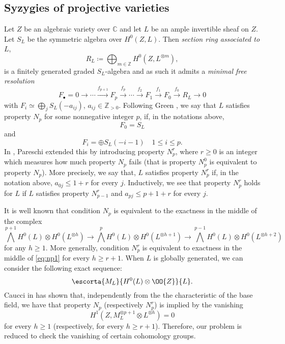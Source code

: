 \documentclass[11pt,letter]{amsart}
\numberwithin{equation}{section}
\begin{document}
\subsection{Syzygies of projective varieties}\label{sub:N_P}
Let $Z$ be an algebraic variety over $\mathbb{C}$ and let $L$ be an ample
invertible sheaf on $Z$. Let $S_L$ be the symmetric algebra over $H^0(Z,L)$. Then \textit{section ring associated to  $L$},
\[R_L\coloneqq \bigoplus_{m\in\mathbb{Z}}H^{0}({Z},{L^{
\otimes m}}),\]
is a finitely generated graded $S_L$-algebra and as such it admits a \textit{minimal free
resolution} 
\begin{equation}\label{minalfree}
F_\bullet = 0\rightarrow\cdots\xrightarrow{f_{p+1}}
F_p\xrightarrow{f_p}\cdots\xrightarrow{f_2} F_1\xrightarrow{f_1}
F_0\xrightarrow{f_0}R_L\rightarrow 0
\end{equation}
with  $F_i\simeq\bigoplus_j S_L(-a_{ij})$, $a_{ij}\in\mathbb  Z_{>0}$.
Following Green \cite{green1984koszul},  we say that $L$ satisfies
property $N_p$ for some nonnegative integer $p$, if, in the notations above,
$$F_0=S_L$$
and
$$F_i=\oplus S_L(-i-1)\quad 1\leq i\leq p.$$
In \cite{pareschi2000syzygies}, Pareschi  extended this by introducing property $N_p^r$, where $r\geq 0$ is an integer which measures how much property $N_p$ fails (that is property $N_p^0$ is equivalent to property $N_p$). More precisely, we say that, $L$ satisfies property $N_p^r$ if, in the notation above, $a_{0j}\leq 1+r$ for
every $j$. Inductively, we see that property $N_p^r$ holds for $L$ if $L$ satisfies  property $N_{p-1}^r$ and $a_{pj}\leq p+1+r$ for every $j$.\par
 It is well known that condition $N_p$ is equivalent to the exactness in the middle of the complex
\begin{equation}\label{eq:np1}
 \bigwedge^{p+1}H^0(L)\otimes H^0(L^{\otimes h})\rightarrow \bigwedge^{p}H^0(L)\otimes H^0(L^{\otimes
h+1})\rightarrow \bigwedge^{p-1}H^0(L)\otimes H^0(L^{\otimes h+2})
\end{equation}
for any $h\geq 1$. More  generally, condition $N_p^r$ is equivalent to exactness in the middle of
\eqref{eq:np1} for every $h\geq r+1$. When $L$ is globally generated, we can consider the following exact sequence:
\begin{equation}
 \escorta{M_L}{H^0(L)\otimes\OO{Z}}{L}.
\end{equation}
Caucci in \cite[Prop.4.1]{Caucci} has shown that, independently from the the characteristic of the base field, we have that property $N_p$ (respectively $N_p^r$) is implied by the vanishing 
\begin{equation}\label{importan vanishing}
    H^1(Z,M_{L}^{\otimes p+1}\otimes L^{\otimes h})=0
\end{equation}
for every $h\geq 1$ (respectively, for every $h\geq r+1$). Therefore, our problem is reduced to check the vanishing of certain cohomology groups.
\end{document}
